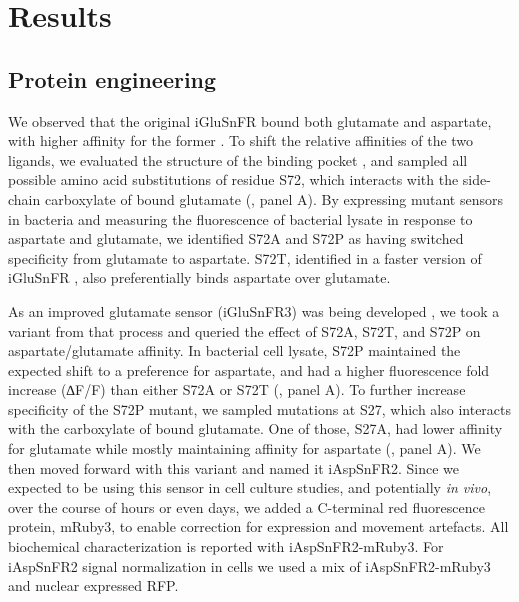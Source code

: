 \documentclass[9pt,lineno]{elife}
\begin{document}
\section{Results}

\subsection{Protein engineering}
We observed that the original iGluSnFR bound both glutamate and aspartate, with higher affinity for the former \citep{Marvin2013-qq}.
To shift the relative affinities of the two ligands, we evaluated the structure of the binding pocket  \citep{Hu2008-nd}, and sampled all possible amino acid substitutions of residue S72, which interacts with the side-chain carboxylate of bound glutamate (, panel A).
By expressing mutant sensors in bacteria and measuring the fluorescence of bacterial lysate in response to aspartate and glutamate, we identified S72A and S72P as having switched specificity from glutamate to aspartate.
S72T, identified in a faster version of iGluSnFR \citep{Helassa2018-fb}, also preferentially binds aspartate over glutamate.

As an improved glutamate sensor (iGluSnFR3) was being developed \citep{Aggarwal2023-pi}, we took a variant from that process and queried the effect of S72A, S72T, and S72P on aspartate/glutamate affinity.
In bacterial cell lysate, S72P maintained the expected shift to a preference for aspartate, and had a higher fluorescence fold increase (∆F/F) than either S72A or S72T (, panel A).
To further increase specificity of the S72P mutant, we sampled mutations at S27, which also interacts with the carboxylate of bound glutamate.
One of those, S27A, had lower affinity for glutamate while mostly maintaining affinity for aspartate (, panel A).
We then moved forward with this variant and named it iAspSnFR2.
Since we expected to be using this sensor in cell culture studies, and potentially \textit{in vivo}, over the course of hours or even days, we added a C-terminal red fluorescence protein, mRuby3, to enable correction for expression and movement artefacts.
All biochemical characterization is reported with iAspSnFR2-mRuby3.
For iAspSnFR2 signal normalization in cells we used a mix of iAspSnFR2-mRuby3 and nuclear expressed RFP.
\end{document}
